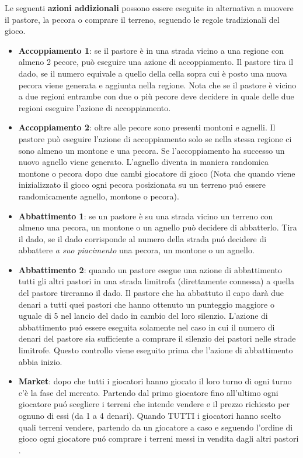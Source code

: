 \documentclass{article}
\begin{document}
Le seguenti \textbf{azioni addizionali} possono essere eseguite  in alternativa a muovere il pastore, la pecora o comprare il terreno, seguendo le regole tradizionali del gioco.
\begin{itemize}
\item \textbf{Accoppiamento 1}: se il pastore \` e in una strada vicino a una regione con almeno 2 pecore, pu\` o eseguire una azione di accoppiamento. Il pastore tira il dado, se il numero equivale a quello della cella sopra cui \` e posto una nuova pecora viene generata e aggiunta nella regione. Nota che se il pastore \` e vicino a due regioni entrambe con due o pi\` u pecore deve decidere in quale delle due regioni eseguire l'azione di accoppiamento. 
\item \textbf{Accoppiamento 2}: oltre alle pecore sono presenti montoni e agnelli. Il pastore pu\` o eseguire l'azione di accoppiamento solo se nella stessa regione ci sono almeno un montone e una pecora. Se l'accoppiamento ha successo un nuovo agnello viene generato. L'agnello diventa in maniera randomica montone o pecora dopo due cambi giocatore di gioco (Nota che quando viene inizializzato il gioco ogni pecora posizionata su un terreno pu\' o essere randomicamente agnello, montone o pecora).
\item \textbf{Abbattimento 1}: se un pastore \` e su una strada vicino un terreno con almeno una pecora, un montone o un agnello pu\` o  decidere di abbatterlo. Tira il dado, se il dado corrisponde al numero della strada pu\' o decidere di abbattere \emph{a suo piacimento} una pecora,  un montone o un agnello.
\item \textbf{Abbattimento 2}:  quando un pastore esegue una azione di abbattimento tutti gli altri pastori in una strada limitrofa (direttamente connessa) a quella del pastore tireranno il dado. Il pastore che ha abbattuto il capo dar\` a due denari a tutti quei pastori che hanno ottenuto un punteggio maggiore o uguale di 5 nel lancio del dado in cambio del loro silenzio. L'azione di abbattimento pu\' o essere eseguita solamente nel caso in cui il numero di denari del pastore sia sufficiente a comprare il silenzio dei pastori nelle strade limitrofe. Questo controllo viene eseguito prima che l'azione di abbattimento abbia inizio.
\item \textbf{Market}: dopo che tutti i giocatori hanno giocato il loro turno di ogni turno c'\`e la fase del mercato. Partendo dal  primo giocatore  fino all'ultimo ogni giocatore pu\' o scegliere i terreni che intende vendere e il prezzo richiesto per ognuno di essi (da 1 a 4 denari). Quando TUTTI i giocatori hanno scelto quali terreni vendere, partendo da un giocatore a caso e seguendo l'ordine di gioco ogni giocatore  pu\' o comprare i terreni messi in vendita dagli altri pastori .
\end{itemize}
\end{document}
